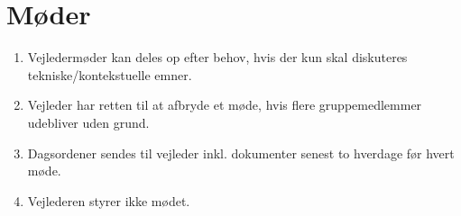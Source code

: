 \section{Møder}
\begin{enumerate}
\item{Vejledermøder kan deles op efter behov, hvis der kun skal diskuteres tekniske/kontekstuelle
emner.}
\item{Vejleder har retten til at afbryde et møde, hvis flere gruppemedlemmer udebliver uden grund.}
\item{Dagsordener sendes til vejleder inkl. dokumenter senest to hverdage før hvert møde.}
\item{Vejlederen styrer ikke mødet.}
\end{enumerate}
